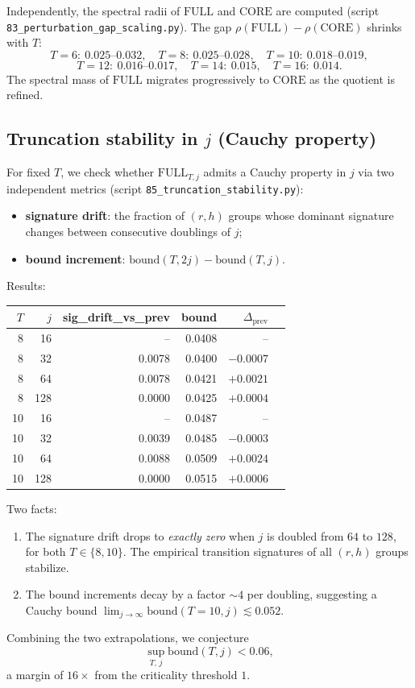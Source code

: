 \documentclass[11pt,a4paper]{article}
\theoremstyle{definition}
\newcommand{\full}{\mathrm{FULL}}
\newcommand{\core}{\mathrm{CORE}}
\newcommand{\spec}{\rho}
\begin{document}
Independently, the spectral radii of $\full$ and $\core$ are
computed (script \verb|83_perturbation_gap_scaling.py|). The gap
$\spec(\full) - \spec(\core)$ shrinks with $T$:
\[
T=6:\ 0.025\text{--}0.032,
\quad
T=8:\ 0.025\text{--}0.028,
\quad
T=10:\ 0.018\text{--}0.019,
\]
\[
T=12:\ 0.016\text{--}0.017,
\quad
T=14:\ 0.015,
\quad
T=16:\ 0.014.
\]
The spectral mass of $\full$ migrates progressively to $\core$ as
the quotient is refined.

\subsection{Truncation stability in $j$ (Cauchy property)}

For fixed $T$, we check whether $\full_{T, j}$ admits a Cauchy
property in $j$ via two independent metrics
(script \verb|85_truncation_stability.py|):
\begin{itemize}
  \item \textbf{signature drift}: the fraction of $(r, h)$ groups
        whose dominant signature changes between consecutive
        doublings of $j$;
  \item \textbf{bound increment}: $\mathrm{bound}(T, 2j) - \mathrm{bound}(T, j)$.
\end{itemize}

Results:

\begin{center}
\begin{tabular}{rrrrrr}
\toprule
$T$ & $j$ & sig\_drift\_vs\_prev & bound & $\Delta_{\mathrm{prev}}$ \\
\midrule
 8 & 16  & --     & 0.0408 & --      \\
 8 & 32  & 0.0078 & 0.0400 & $-0.0007$ \\
 8 & 64  & 0.0078 & 0.0421 & $+0.0021$ \\
 8 & 128 & 0.0000 & 0.0425 & $+0.0004$ \\
\midrule
10 & 16  & --     & 0.0487 & --      \\
10 & 32  & 0.0039 & 0.0485 & $-0.0003$ \\
10 & 64  & 0.0088 & 0.0509 & $+0.0024$ \\
10 & 128 & 0.0000 & 0.0515 & $+0.0006$ \\
\bottomrule
\end{tabular}
\end{center}

Two facts:
\begin{enumerate}
  \item The signature drift drops to \emph{exactly zero} when $j$ is
        doubled from $64$ to $128$, for both $T \in \{8, 10\}$. The
        empirical transition signatures of all $(r, h)$ groups
        stabilize.
  \item The bound increments decay by a factor $\sim 4$ per
        doubling, suggesting a Cauchy bound
        $\lim_{j\to\infty}\mathrm{bound}(T=10, j) \lesssim 0.052$.
\end{enumerate}
Combining the two extrapolations, we conjecture
\[
\sup_{T,\, j} \mathrm{bound}(T, j) < 0.06,
\]
a margin of $16\times$ from the criticality threshold $1$.
\end{document}
